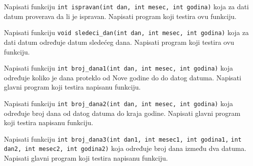 \begin{Exercise}[label=p1.4_] 
Napisati funkciju \verb|int ispravan(int dan, int mesec, int godina)|
koja za dati datum proverava da li je ispravan. Napisati program koji testira ovu funkciju. \\ 
\end{Exercise}
\begin{Answer}[ref=p1.4_]
\end{Answer}


\begin{Exercise}[label=p1.4_] 
Napisati funkciju
\verb|void sledeci_dan(int dan, int mesec, int godina)| koja za dati
datum određuje datum slede\'ceg dana. Napisati program koji testira ovu funkciju. \\ 
\end{Exercise}
\begin{Answer}[ref=p1.4_]
\end{Answer}

\begin{Exercise}[label=p1.4_] 
Napisati funkciju
\verb|int broj_dana1(int dan, int mesec, int godina)| koja određuje koliko je dana proteklo od Nove godine do 
do datog datuma. Napisati glavni program koji testira napisanu funkciju. \\ 
\end{Exercise}
\begin{Answer}[ref=p1.4_]
\end{Answer}

\begin{Exercise}[label=p1.4_] 
Napisati funkciju
\verb|int broj_dana2(int dan, int mesec, int godina)| koja određuje broj dana od datog datuma do kraja godine. Napisati glavni program koji testira napisanu funkciju. \\ 
\end{Exercise}
\begin{Answer}[ref=p1.4_]
\end{Answer}

\begin{Exercise}[label=p1.4_] 
Napisati funkciju
\verb|int broj_dana3(int dan1, int mesec1, int godina1,|
\verb|int dan2, int mesec2, int godina2)| koja određuje broj dana
između dva datuma. Napisati glavni program koji testira napisanu funkciju. \\ 
\end{Exercise}
\begin{Answer}[ref=p1.4_]
\end{Answer}

